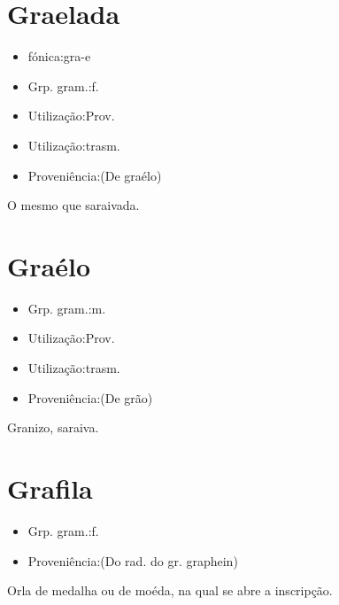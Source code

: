 \section{Graelada}
\begin{itemize}
\item {fónica:gra-e}
\end{itemize}
\begin{itemize}
\item {Grp. gram.:f.}
\end{itemize}
\begin{itemize}
\item {Utilização:Prov.}
\end{itemize}
\begin{itemize}
\item {Utilização:trasm.}
\end{itemize}
\begin{itemize}
\item {Proveniência:(De \textunderscore graélo\textunderscore )}
\end{itemize}
O mesmo que \textunderscore saraivada\textunderscore .
\section{Graélo}
\begin{itemize}
\item {Grp. gram.:m.}
\end{itemize}
\begin{itemize}
\item {Utilização:Prov.}
\end{itemize}
\begin{itemize}
\item {Utilização:trasm.}
\end{itemize}
\begin{itemize}
\item {Proveniência:(De \textunderscore grão\textunderscore )}
\end{itemize}
Granizo, saraiva.
\section{Grafila}
\begin{itemize}
\item {Grp. gram.:f.}
\end{itemize}
\begin{itemize}
\item {Proveniência:(Do rad. do gr. \textunderscore graphein\textunderscore )}
\end{itemize}
Orla de medalha ou de moéda, na qual se abre a inscripção.
